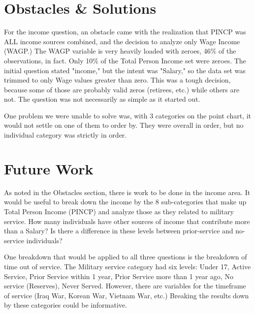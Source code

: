 \documentclass{article}
\begin{document}
\section{Obstacles \& Solutions}
For the income question, an obstacle came with the realization that PINCP was ALL income sources combined, and the decision to analyze only Wage Income (WAGP.) The WAGP variable is very heavily loaded with zeroes, 46\% of the observations, in fact. Only 10\% of the Total Person Income set were zeroes. The initial question stated "income," but the intent was "Salary," so the data set was trimmed to only Wage values greater than zero. This was a tough decision, because some of those are probably valid zeros (retirees, etc.) while others are not. The question was not necessarily as simple as it started out. 

One problem we were unable to solve was, with 3 categories on the point chart, it would not settle on one of them to order by. They were overall in order, but no individual category was strictly in order.


\section{Future Work}
As noted in the Obstacles section, there is work to be done in the income area. It would be useful to break down the income by the 8 sub-categories that make up Total Person Income (PINCP) and analyze those as they related to military service. How many individuals have other sources of income that contribute more than a Salary? Is there a difference in these levels between prior-service and no-service individuals?

One breakdown that would be applied to all three questions is the breakdown of time out of service. The Military service category had six levels: Under 17, Active Service, Prior Service within 1 year, Prior Service more than 1 year ago, No service (Reserves), Never Served. However, there are variables for the timeframe of service (Iraq War, Korean War, Vietnam War, etc.) Breaking the results down by these categories could be informative. 
\end{document}
